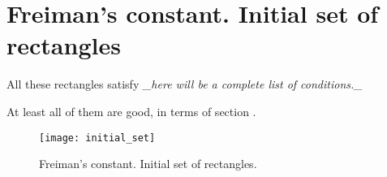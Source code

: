 \section{Freiman's constant. Initial set of rectangles}

All these rectangles satisfy \textit{\_here will be a complete list of conditions.\_}

At least all of them are good, in terms of section .


\begin{figure}[H]
	\centering
	\texttt{[image: initial\_set]}
	\caption{Freiman's constant. Initial set of rectangles.}
	\label{fc_init}
\end{figure}
